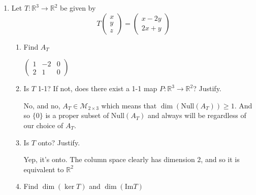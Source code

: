 \documentclass[letterpaper]{article}
\begin{document}
\begin{enumerate}
\item
Let $T:\mathbb{R}^3\to\mathbb{R}^2$ be given by
\[T\left(\begin{array}{r}x\\y\\z\end{array}\right)
  =\left(\begin{array}{r}x-2y\\2x+y\end{array}\right)\]
  \begin{enumerate}
  \item
  Find $A_T$

  $\left(\begin{array}{rrr}1&-2&0\\2&1&0\end{array}\right)$
  \item
  Is $T$ 1-1? If not, does there exist a 1-1 map $P:\mathbb{R}^3\to\mathbb{R}^2$? Justify.

  No, and no, $A_T\in \mathcal{M}_{2\times 3}$ which means that $\dim(\text{Null}(A_T))\ge 1$. And so $\{0\}$ is a proper subset of $\text{Null}(A_T)$ and always will be regardless of our choice of $A_T$.
  \item
  Is $T$ onto? Justify.

  Yep, it's onto. The column space clearly has dimension 2, and so it is equivalent to $\mathbb{R}^2$
  \item
  Find $\dim(\ker T)$ and $\dim(\text{Im} T)$


\end{enumerate}
\end{enumerate}
\end{document}
